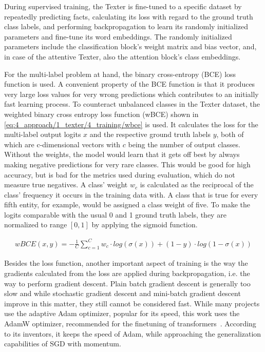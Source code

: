 During supervised training, the Texter is fine-tuned to a specific dataset by repeatedly predicting facts, calculating its loss with regard to the ground truth class labels, and performing backpropagation to learn its randomly initialized parameters and fine-tune its word embeddings. The randomly initialized parameters include the classification block's weight matrix and bias vector, and, in case of the attentive Texter, also the attention block's class embeddings.

For the multi-label problem at hand, the binary cross-entropy (BCE) loss function is used. A convenient property of the BCE function is that it produces very large loss values for very wrong predictions which contributes to an initially fast learning process. To counteract unbalanced classes in the Texter dataset, the weighted binary cross entropy loss function (wBCE) shown in \autoref{eq:4_approach/1_texter/4_training/wbce} is used. It calculates the loss for the multi-label output logits $x$ and the respective ground truth labels $y$, both of which are c-dimensional vectors with $c$ being the number of output classes. Without the weights, the model would learn that it gets off best by always making negative predictions for very rare classes. This would be good for high accuracy, but is bad for the metrics used during evaluation, which do not measure true negatives. A class' weight $w_c$ is calculated as the reciprocal of the class' frequency it occurs in the training data with. A class that is true for every fifth entity, for example, would be assigned a class weight of five. To make the logits comparable with the usual 0 and 1 ground truth labels, they are normalized to range $[0, 1]$ by applying the sigmoid function.

\begin{align}
    wBCE(x, y) = - \frac{1}{C} \sum_{c = 1}^C w_c \cdot log(\sigma(x)) + (1 - y) \cdot log(1 - \sigma(x))
    \label{eq:4_approach/1_texter/4_training/wbce}
\end{align}

Besides the loss function, another important aspect of training is the way the gradients calculated from the loss are applied during backpropagation, i.e. the way to perform gradient descent. Plain batch gradient descent is generally too slow and while stochastic gradient descent and mini-batch gradient descent improve in this matter, they still cannot be considered fast. While many projects use the adaptive Adam optimizer, popular for its speed, this work uses the AdamW optimizer, recommended for the finetuning of transformers~\cite{Loshchilov2019DecoupledWD}. According to its inventors, it keeps the speed of Adam, while approaching the generalization capabilities of SGD with momentum.
